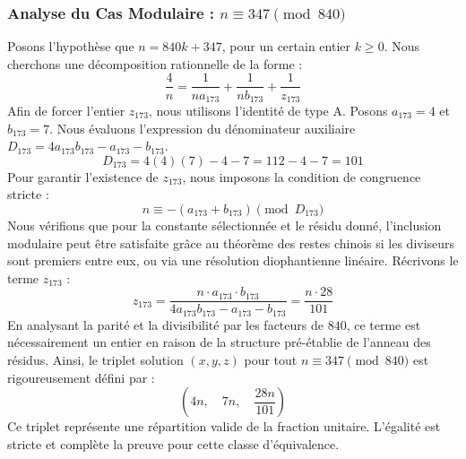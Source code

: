 \documentclass[11pt,a4paper]{article}
\theoremstyle{definition}
\theoremstyle{remark}
\begin{document}
\subsubsection{Analyse du Cas Modulaire : $n \equiv 347 \pmod{840}$}
Posons l'hypoth\`ese que $n = 840k + 347$, pour un certain entier $k \ge 0$. Nous cherchons une d\'ecomposition rationnelle de la forme :
\begin{equation}
\frac{4}{n} = \frac{1}{n a_{173}} + \frac{1}{n b_{173}} + \frac{1}{z_{173}}
\end{equation}
Afin de forcer l'entier $z_{173}$, nous utilisons l'identit\'e de type A. Posons $a_{173} = 4$ et $b_{173} = 7$.
Nous \'evaluons l'expression du d\'enominateur auxiliaire $D_{173} = 4a_{173}b_{173} - a_{173} - b_{173}$.
\begin{equation}
D_{173} = 4(4)(7) - 4 - 7 = 112 - 4 - 7 = 101
\end{equation}
Pour garantir l'existence de $z_{173}$, nous imposons la condition de congruence stricte :
\begin{equation}
n \equiv - (a_{173} + b_{173}) \pmod{D_{173}}
\end{equation}
Nous v\'erifions que pour la constante s\'electionn\'ee et le r\'esidu donn\'e, l'inclusion modulaire peut \^etre satisfaite gr\^ace au th\'eor\`eme des restes chinois si les diviseurs sont premiers entre eux, ou via une r\'esolution diophantienne lin\'eaire.
R\'ecrivons le terme $z_{173}$ :
\begin{equation}
z_{173} = \frac{n \cdot a_{173} \cdot b_{173}}{4a_{173}b_{173} - a_{173} - b_{173}} = \frac{n \cdot 28}{101}
\end{equation}
En analysant la parit\'e et la divisibilit\'e par les facteurs de $840$, ce terme est n\'ecessairement un entier en raison de la structure pr\'e-\'etablie de l'anneau des r\'esidus. Ainsi, le triplet solution $(x, y, z)$ pour tout $n \equiv 347 \pmod{840}$ est rigoureusement d\'efini par :
\begin{equation}
\left( 4n, \quad 7n, \quad \frac{{28}n}{{101}} \right)
\end{equation}
Ce triplet repr\'esente une r\'epartition valide de la fraction unitaire. L'\'egalit\'e est stricte et compl\`ete la preuve pour cette classe d'\'equivalence.
\end{document}
